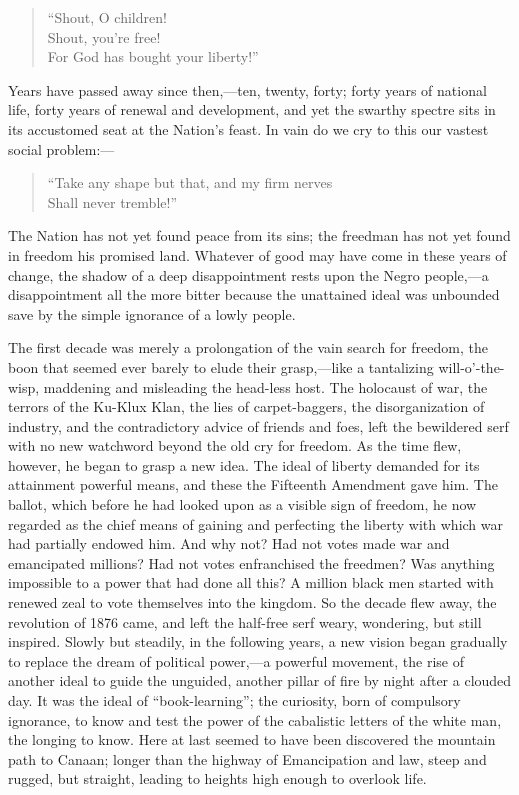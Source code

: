 \begin{verse}
  ``Shout, O children!\\
  Shout, you're free!\\
  For God has bought your liberty!''
\end{verse}

Years have passed away since then,---ten, twenty, forty; forty years
of national life, forty years of renewal and development, and yet the
swarthy spectre sits in its accustomed seat at the Nation's feast. In
vain do we cry to this our vastest social problem:---

\begin{verse}
  ``Take any shape but that, and my firm nerves\\
  Shall never tremble!''
\end{verse}

The Nation has not yet found peace from its sins; the freedman has not
yet found in freedom his promised land. Whatever of good may have come
in these years of change, the shadow of a deep disappointment rests
upon the Negro people,---a disappointment all the more bitter because
the unattained ideal was unbounded save by the simple ignorance of a
lowly people.

The first decade was merely a prolongation of the vain search for
freedom, the boon that seemed ever barely to elude their grasp,---like
a tantalizing will-o'-the-wisp, maddening and misleading the
head-less host. The holocaust of war, the terrors of the
Ku-Klux Klan, the lies of carpet-baggers, the disorganization of
industry, and the contradictory advice of friends and foes, left the
bewildered serf with no new watchword beyond the old cry for freedom.
As the time flew, however, he began to grasp a new idea. The ideal of
liberty demanded for its attainment powerful means, and these the
Fifteenth Amendment gave him. The ballot, which before he had looked
upon as a visible sign of freedom, he now regarded as the chief means
of gaining and perfecting the liberty with which war had partially
endowed him. And why not? Had not votes made war and emancipated
millions? Had not votes enfranchised the freedmen? Was anything
impossible to a power that had done all this? A million black men
started with renewed zeal to vote themselves into the kingdom. So the
decade flew away, the revolution of 1876 came, and left the half-free
serf weary, wondering, but still inspired. Slowly but steadily, in the
following years, a new vision began gradually to replace the dream of
political power,---a powerful movement, the rise of another ideal to
guide the unguided, another pillar of fire by night after a clouded
day. It was the ideal of ``book-learning''; the curiosity, born of
compulsory ignorance, to know and test the power of the cabalistic
letters of the white man, the longing to know. Here at last seemed to
have been discovered the mountain path to Canaan; longer than the
highway of Emancipation and law, steep and rugged, but straight,
leading to heights high enough to overlook life.

